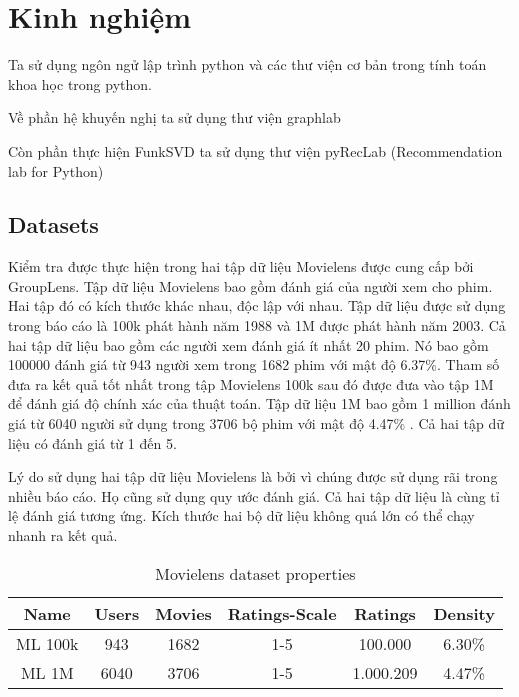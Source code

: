 \chapter{Kinh nghiệm}
Ta sử dụng ngôn ngử lập trình python và các thư viện cơ bản trong tính toán khoa học trong python.

Về phần hệ khuyến nghị ta sử dụng thư viện graphlab 

Còn phần thực hiện FunkSVD ta sử dụng thư viện pyRecLab (Recommendation lab for Python)
\section{Datasets}
Kiểm tra được thực hiện trong hai tập dữ liệu Movielens được cung cấp bởi GroupLens. Tập dữ liệu Movielens bao gồm đánh giá của người xem cho phim. Hai tập đó có kích thước khác nhau, độc lập với nhau. Tập dữ liệu được sử dụng trong báo cáo là 100k phát hành năm 1988 và 1M được phát hành năm 2003. Cả hai tập dữ liệu bao gồm các người xem đánh giá ít nhất 20 phim. Nó bao gồm 100000 đánh giá từ 943 người xem trong 1682 phim với mật độ 6.37\%. Tham số đưa ra kết quả tốt nhất trong tập Movielens 100k sau đó được đưa vào tập 1M để đánh giá độ chính xác của thuật toán. Tập dữ liệu 1M bao gồm 1 million đánh giá từ 6040 người sử dụng trong 3706 bộ phim với mật độ 4.47\% . Cả hai tập dữ liệu có đánh giá từ 1 đến 5.

Lý do sử dụng hai tập dữ liệu Movielens là bởi vì chúng được sử dụng rãi trong nhiều báo cáo. Họ cũng sử dụng quy ước đánh giá. Cả hai tập dữ liệu là cùng tỉ lệ đánh giá tương ứng. Kích thước hai bộ dữ liệu không quá lớn có thể chạy nhanh ra kết quả.

\begin{table}[H]
\caption{Movielens dataset properties}
\label{table:2}
\begin{center}
\begin{tabular}{|c|c|c|c|c|c|}
\hline 
Name & Users & Movies & Ratings-Scale & Ratings & Density \\ 
\hline 
ML 100k & 943 & 1682 & 1-5 & 100.000 & 6.30\% \\ 
\hline 
ML 1M & 6040 & 3706 & 1-5 & 1.000.209 & 4.47\% \\ 
\hline 
\end{tabular} 
\end{center}
\end{table}
